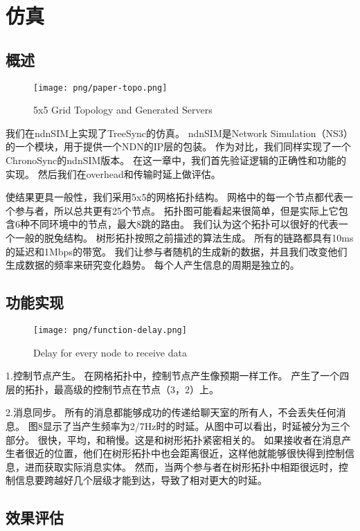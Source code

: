 \chapter{仿真}

\section{概述}

\begin{figure}
\centering
\texttt{[image: png/paper-topo.png]}
\caption{5x5 Grid Topology and Generated Servers}
\label{paper_topo}
\end{figure}

我们在ndnSIM上实现了TreeSync的仿真。
ndnSIM是Network Simulation（NS3）的一个模块，用于提供一个NDN的IP层的包装。
作为对比，我们同样实现了一个ChronoSync的ndnSIM版本。
在这一章中，我们首先验证逻辑的正确性和功能的实现。
然后我们在overhead和传输时延上做评估。

使结果更具一般性，我们采用5x5的网格拓扑结构。
网格中的每一个节点都代表一个参与者，所以总共更有25个节点。
拓扑图可能看起来很简单，但是实际上它包含6种不同环境中的节点，最大8跳的路由。
我们认为这个拓扑可以很好的代表一个一般的脱兔结构。
树形拓扑按照之前描述的算法生成。
所有的链路都具有10ms的延迟和1Mbps的带宽。
我们让参与者随机的生成新的数据，并且我们改变他们生成数据的频率来研究变化趋势。
每个人产生信息的周期是独立的。

\section{功能实现}

\begin{figure}
\centering
\texttt{[image: png/function-delay.png]}
\caption{Delay for every node to receive data}
\label{function_delay}
\end{figure}

1.控制节点产生。
在网格拓扑中，控制节点产生像预期一样工作。
产生了一个四层的拓扑，最高级的控制节点在节点（3，2）上。

2.消息同步。
所有的消息都能够成功的传递给聊天室的所有人，不会丢失任何消息。
图8显示了当产生频率为2/7Hz时的时延。从图中可以看出，时延被分为三个部分。
很快，平均，和稍慢。这是和树形拓扑紧密相关的。
如果接收者在消息产生者很近的位置，他们在树形拓扑中也会距离很近，这样他就能够很快得到控制信息，进而获取实际消息实体。
然而，当两个参与者在树形拓扑中相距很远时，控制信息要跨越好几个层级才能到达，导致了相对更大的时延。


\section{效果评估}

